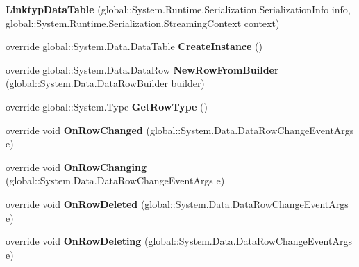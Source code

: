 \begin{DoxyCompactItemize}
\item 
{\bfseries Linktyp\+Data\+Table} (global\+::\+System.\+Runtime.\+Serialization.\+Serialization\+Info info, global\+::\+System.\+Runtime.\+Serialization.\+Streaming\+Context context)\hypertarget{class_products_1_1_data_1_1ds_sage_1_1_linktyp_data_table_aa0dfac853360e5ad137fdebdd7bb85ea}{}\label{class_products_1_1_data_1_1ds_sage_1_1_linktyp_data_table_aa0dfac853360e5ad137fdebdd7bb85ea}

\item 
override global\+::\+System.\+Data.\+Data\+Table {\bfseries Create\+Instance} ()\hypertarget{class_products_1_1_data_1_1ds_sage_1_1_linktyp_data_table_ae918cd8e42afbd59694af5b61fa7b0c7}{}\label{class_products_1_1_data_1_1ds_sage_1_1_linktyp_data_table_ae918cd8e42afbd59694af5b61fa7b0c7}

\item 
override global\+::\+System.\+Data.\+Data\+Row {\bfseries New\+Row\+From\+Builder} (global\+::\+System.\+Data.\+Data\+Row\+Builder builder)\hypertarget{class_products_1_1_data_1_1ds_sage_1_1_linktyp_data_table_a0be99cffd7f14ef1f77e9c4032e35a58}{}\label{class_products_1_1_data_1_1ds_sage_1_1_linktyp_data_table_a0be99cffd7f14ef1f77e9c4032e35a58}

\item 
override global\+::\+System.\+Type {\bfseries Get\+Row\+Type} ()\hypertarget{class_products_1_1_data_1_1ds_sage_1_1_linktyp_data_table_a88f6952b861412d1eb4b6d87858a028f}{}\label{class_products_1_1_data_1_1ds_sage_1_1_linktyp_data_table_a88f6952b861412d1eb4b6d87858a028f}

\item 
override void {\bfseries On\+Row\+Changed} (global\+::\+System.\+Data.\+Data\+Row\+Change\+Event\+Args e)\hypertarget{class_products_1_1_data_1_1ds_sage_1_1_linktyp_data_table_ada2d84bf8cdcee2e36e850cf74bf703a}{}\label{class_products_1_1_data_1_1ds_sage_1_1_linktyp_data_table_ada2d84bf8cdcee2e36e850cf74bf703a}

\item 
override void {\bfseries On\+Row\+Changing} (global\+::\+System.\+Data.\+Data\+Row\+Change\+Event\+Args e)\hypertarget{class_products_1_1_data_1_1ds_sage_1_1_linktyp_data_table_a7af2f98b05ff87a8d12cca9ae98377b5}{}\label{class_products_1_1_data_1_1ds_sage_1_1_linktyp_data_table_a7af2f98b05ff87a8d12cca9ae98377b5}

\item 
override void {\bfseries On\+Row\+Deleted} (global\+::\+System.\+Data.\+Data\+Row\+Change\+Event\+Args e)\hypertarget{class_products_1_1_data_1_1ds_sage_1_1_linktyp_data_table_a3d8ebfb68643de98dcaee1ba1a1c026a}{}\label{class_products_1_1_data_1_1ds_sage_1_1_linktyp_data_table_a3d8ebfb68643de98dcaee1ba1a1c026a}

\item 
override void {\bfseries On\+Row\+Deleting} (global\+::\+System.\+Data.\+Data\+Row\+Change\+Event\+Args e)\hypertarget{class_products_1_1_data_1_1ds_sage_1_1_linktyp_data_table_ad8b032784c28814aa170b959b01ab0c5}{}\label{class_products_1_1_data_1_1ds_sage_1_1_linktyp_data_table_ad8b032784c28814aa170b959b01ab0c5}

\end{DoxyCompactItemize}
